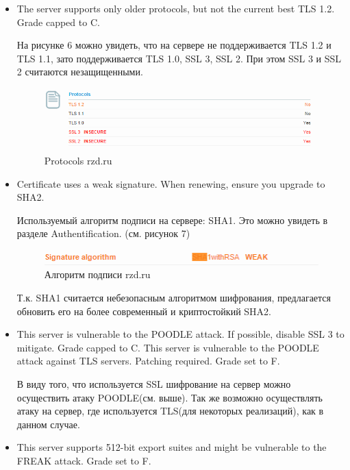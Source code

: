 \documentclass[11pt, a4paper]{article}		%
\begin{document}
\begin{itemize}

\item The server supports only older protocols, but not the current best TLS 1.2. Grade capped to C.

На рисунке 6 можно увидеть, что на сервере не поддерживается TLS 1.2 и TLS 1.1, зато поддерживается TLS 1.0, SSL 3, SSL 2.
При этом SSL 3 и SSL 2 считаются незащищенными.

\begin{figure}[h!]
\centering
\includegraphics[scale=0.8]{res/protocols_rzd}
\caption{Protocols rzd.ru}
\end{figure}

\item Certificate uses a weak signature. When renewing, ensure you upgrade to SHA2.

Используемый алгоритм подписи на сервере: SHA1. Это можно увидеть в разделе Authentification. (см. рисунок 7)

\begin{figure}[h!]
\centering
\includegraphics[scale=0.8]{res/signature_rzd}
\caption{Алгоритм подписи rzd.ru}
\end{figure}

Т.к. SHA1 считается небезопасным алгоритмом шифрования, предлагается обновить его на более современный и криптостойкий SHA2. 

\item This server is vulnerable to the POODLE attack. If possible, disable SSL 3 to mitigate. Grade capped to C. This server is vulnerable to the POODLE attack against TLS servers. Patching required. Grade set to F.

В виду того, что используется SSL шифрование на сервер можно осуществить атаку POODLE(см. выше). Так же возможно осуществлять атаку на сервер, где используется TLS(для некоторых реализаций), как в данном случае.

\item This server supports 512-bit export suites and might be vulnerable to the FREAK attack. Grade set to F.


\end{itemize}
\end{document}
